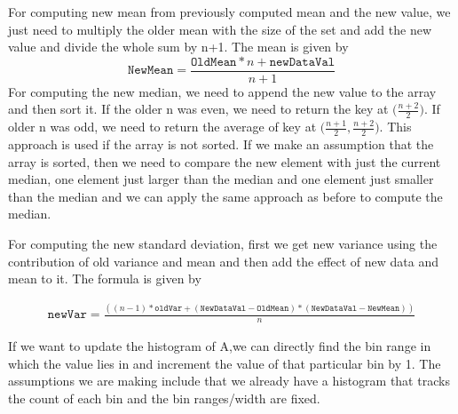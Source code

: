 \begin{tcolorbox}[breakable]
	\begin{sol}
		For computing new mean from previously computed mean and the new value, we just need to multiply the older mean with the size of the set and add the new value and divide the whole sum by n+1. The mean is given by
		\begin{equation}
			\texttt{NewMean}=\frac{\texttt{OldMean}*n+\texttt{newDataVal}}{n+1}
		\end{equation}
		For computing the new median, we need to append the new value to the array and then sort it. If the older n was even, we need to return the key at $\big(\frac{n+2}{2}\big)$. If older n was odd, we need to return the average of key at $\big(\frac{n+1}{2},\frac{n+2}{2}\big)$. This approach is used if the array is not sorted. If we make an assumption that the array is sorted, then we need to compare the new element with just the current median, one element just larger than the median and one element just smaller than the median and we can apply the same approach as before to compute the median.
		\par For computing the new standard deviation, first we get new variance using the contribution of old variance and mean and then add the effect of new data and mean to it. The formula is given by

		\begin{align}
			\texttt{newVar}=\frac{((n-1)*\texttt{oldVar}+(\texttt{NewDataVal}-\texttt{OldMean})*(\texttt{NewDataVal}-\texttt{NewMean}))}{n}
		\end{align}

		\par If we want to update the histogram of A,we can directly find the bin range in which the value lies in and increment the value of that particular bin by 1.
		The assumptions we are making include that we already have a histogram that tracks the count of each bin and the bin ranges/width are fixed.
	\end{sol}
\end{tcolorbox}
